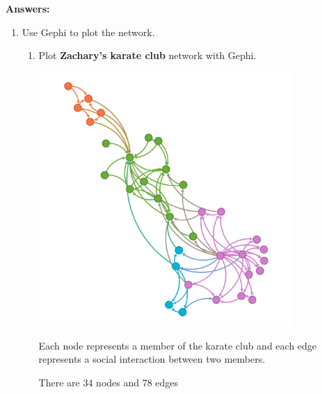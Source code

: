 \documentclass{amsart}
\theoremstyle{definition}
\theoremstyle{remark}
\numberwithin{equation}{section}
\begin{document}
\vspace{0.5 cm}


\textbf{Answers:}

\vspace{0.5 cm}

\begin{enumerate}
    \item Use Gephi to plot the network. \vspace{0.5 cm}
    \begin{enumerate}
        \item Plot \textbf{Zachary's karate club} network with Gephi. \vspace{0.5 cm}
        \centering
        \begin{minipage}{1\textwidth}
        \centering
        \includegraphics[width=0.8\textwidth]{images/karate_v0.png} %
        \end{minipage}

        Each node represents a member of the karate club and each edge represents a social interaction between two members. 

        There are 34 nodes and 78 edges

        \vspace{0.5 cm}


\end{enumerate}
\end{enumerate}
\end{document}
